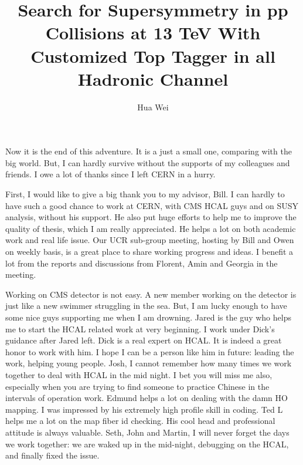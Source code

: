 \documentclass[oneside,final,letterpaper]{ucr}
\begin{document}

\title{Search for Supersymmetry in pp Collisions at 13 TeV With Customized Top Tagger in all Hadronic Channel}
\author{Hua Wei}

\maketitle
\copyrightpage{}
\approvalpage{}

\begin{frontmatter}

\begin{acknowledgements}
Now it is the end of this adventure. It is a just a small one, comparing with the big world. But, I can hardly survive without the supports of my colleagues and friends. I owe a lot of thanks since I left CERN in a hurry. 

First, I would like to give a big thank you to my advisor, Bill. I can hardly to have such a good chance to work at CERN, with CMS HCAL guys and on SUSY analysis, without his support. He also put huge efforts to help me to improve the quality of thesis, which I am really appreciated. He helps a lot on both academic work and real life issue. Our UCR sub-group meeting, hosting by Bill and Owen on weekly basis, is a great place to share working progress and ideas. I benefit a lot from the reports and discussions from Florent, Amin and Georgia in the meeting. 

Working on CMS detector is not easy. A new member working on the detector is just like a new swimmer struggling in the sea. But, I am lucky enough to have some nice guys supporting me when I am drowning. Jared is the guy who helps me to start the HCAL related work at very beginning. I work under Dick’s guidance after Jared left. Dick is a real expert on HCAL. It is indeed a great honor to work with him. I hope I can be a person like him in future: leading the work, helping young people. Josh, I cannot remember how many times we work together to deal with HCAL in the mid night. I bet you will miss me also, especially when you are trying to find someone to practice Chinese in the intervals of operation work. Edmund helps a lot on dealing with the damn HO mapping. I was impressed by his extremely high profile skill in coding. Ted L helps me a lot on the map fiber id checking. His cool head and professional attitude is always valuable. Seth, John and Martin, I will never forget the days we work together: we are waked up in the mid-night, debugging on the HCAL, and finally fixed the issue. 


\end{acknowledgements}
\end{frontmatter}
\end{document}
